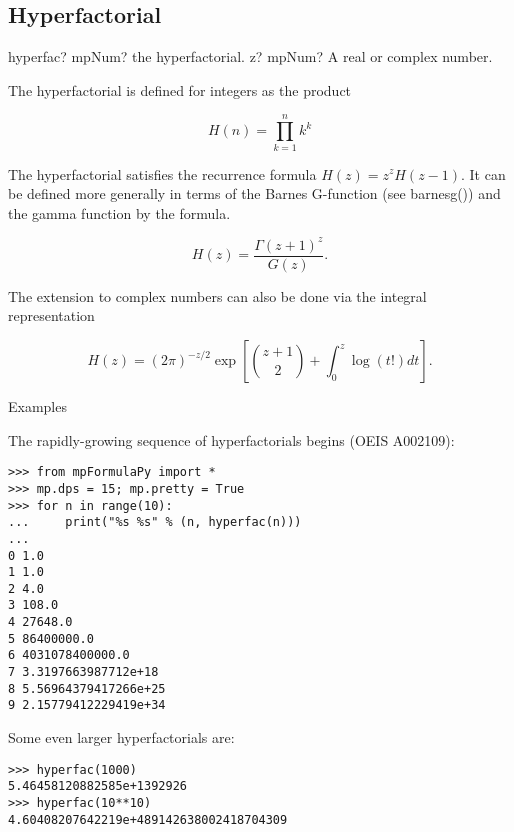 \subsection{Hyperfactorial}

\begin{mpFunctionsExtract}
	\mpFunctionOne
	{hyperfac? mpNum? the hyperfactorial.}
	{z? mpNum? A real or complex number.}
\end{mpFunctionsExtract}


The hyperfactorial is defined for integers as the product

\begin{equation}
H(n) = \prod_{k=1}^n k^k
\end{equation}


The hyperfactorial satisfies the recurrence formula $H(z)=z^z H(z-1)$. It can be
defined more generally in terms of the Barnes G-function (see barnesg()) and the gamma function by the formula.

\begin{equation}
H(z)=\frac{\Gamma(z+1)^z}{G(z)}.
\end{equation}

The extension to complex numbers can also be done via the integral representation

\begin{equation}
H(z)=(2\pi)^{-z/2} \exp \left[\binom{z+1}{2} + \int_0^z \log(t!) dt \right].
\end{equation}



Examples

The rapidly-growing sequence of hyperfactorials begins (OEIS A002109):

\begin{lstlisting}
>>> from mpFormulaPy import *
>>> mp.dps = 15; mp.pretty = True
>>> for n in range(10):
...     print("%s %s" % (n, hyperfac(n)))
...
0 1.0
1 1.0
2 4.0
3 108.0
4 27648.0
5 86400000.0
6 4031078400000.0
7 3.3197663987712e+18
8 5.56964379417266e+25
9 2.15779412229419e+34
\end{lstlisting}

Some even larger hyperfactorials are:

\begin{lstlisting}
>>> hyperfac(1000)
5.46458120882585e+1392926
>>> hyperfac(10**10)
4.60408207642219e+489142638002418704309
\end{lstlisting}

